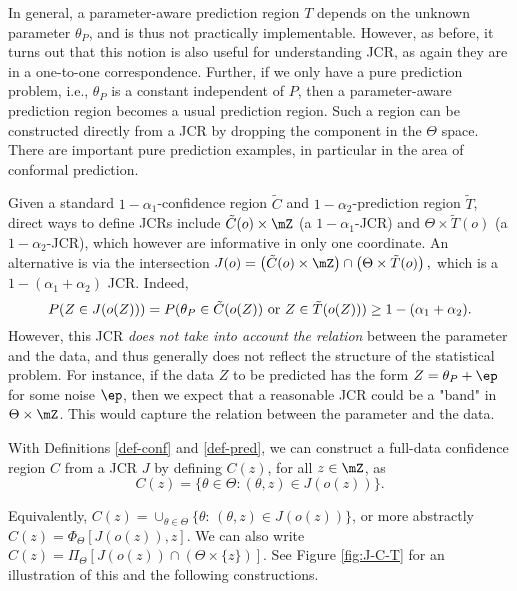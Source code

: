 \documentclass[english]{article}
\begin{document}
In general, a parameter-aware prediction region $T$ depends on the unknown parameter $\theta_P$, and is thus not practically implementable.
However, as before, it turns out that this notion is also useful for understanding JCR, as again they are in a one-to-one correspondence.
Further, if we only have a pure prediction problem, i.e., $\theta_P$ is a constant independent of $P$, 
then 
a parameter-aware prediction region becomes a usual prediction region.
Such a region can be constructed directly from a JCR by dropping the component in the $\Theta$ space.
There are important pure prediction examples, in particular in the area of conformal prediction.


Given a standard  $1-\alpha_1$-confidence region $\tilde C$ and $1-\alpha_2$-prediction region $\tilde T$, 
direct ways to define JCRs include 
$\tilde C(o) \times \mZ$ (a $1-\alpha_1$-JCR) and
$\Theta \times \tilde T(o)$ (a $1-\alpha_2$-JCR),
which however are informative in only one coordinate.
An alternative
is via the intersection
$
J(o) = \left(\tilde C(o) \times \mZ\right) \cap \left(\Theta \times \tilde T(o)\right),
$
which is a $1-(\alpha_1+\alpha_2)$ JCR. Indeed, 
$$
P(Z\in J(o(Z))) = P(\theta_P\in \tilde C(o(Z)) \textnormal{ or } Z \in \tilde T(o(Z)))
\ge 1-(\alpha_1+\alpha_2).
$$
However, this JCR \emph{does not take into account the relation} between the parameter and the data, and thus generally does not reflect the structure of the statistical problem. 
For instance, if the data $Z$ to be predicted  has the form $Z = \theta_P + \ep$ for some noise $\ep$, then we expect that a reasonable JCR could be a "band" in $\Theta\times \mZ$. This would capture the  relation between the parameter and the data.


With Definitions \ref{def-conf} and \ref{def-pred},
we can construct a
full-data    confidence region $C$ from a JCR $J$ by defining $C(z)$, for all $z\in\mZ$, as 
    \begin{equation}\label{eq:J-C}
     C(z) =\{\theta\in \Theta : 
      (\theta,z) \in J(o(z)) \}.
    \end{equation}
    
Equivalently, $C(z) =\cup_{\theta \in \Theta} \{\theta:\, (\theta,z) \in J(o(z)) \}$, or more abstractly
$C(z) =\Phi_{\Theta}[J(o(z)),z]$.
We can also write 
$C(z) =\Pi_{\Theta}[ J(o(z)) \cap (\Theta\times \{z\})]$.
See Figure \ref{fig:J-C-T} for an illustration of this and the following constructions.
\end{document}
